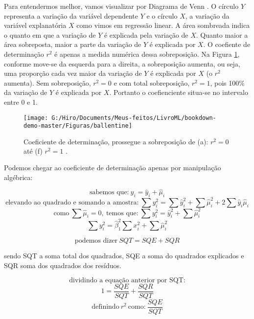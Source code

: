 \documentclass[
  openany]{book}
\begin{document}
Para entendermos melhor, vamos visualizar por Diagrama de Venn \citep{kennedy1981ballentine}. O círculo \(Y\) representa a variação da variável dependente \(Y\) e o círculo \(X\), a variação da variável explanatória \(X\) como vimos em regressão linear. A área sombreada indica o quanto em que a variação de \(Y\) é explicada pela variação de \(X\). Quanto maior a área sobreposta, maior a parte da variação de \(Y\) é explicada por \(X\). O coefiente de determinação \(r^2\) é apenas a medida numérica dessa sobreposição. Na Figura \ref{fig:ballentine}, conforme move-se da esquerda para a direita, a sobreposição aumenta, ou seja, uma proporção cada vez maior da variação de \(Y\)
é explicada por \(X\) (o \(r^2\) aumenta). Sem sobreposição, \(r^2=0\) e com total sobreposição, \(r^2=1\), pois 100\% da variação de \(Y\) é explicada por \(X\). Portanto o coefienciente situa-se no intervalo entre 0 e 1.

\begin{figure}

{\centering \texttt{[image: G:/Hiro/Documents/Meus-feitos/LivroML/bookdown-demo-master/Figuras/ballentine]} 

}

\caption{Coeficiente de determinação, prossegue a sobreposição de (a): \(r^2=0\) até (f) \(r^2=1\) \citep{gujarati2011econometria}.}\label{fig:ballentine}
\end{figure}



Podemos chegar ao coeficiente de determinação apenas por manipulação algébrica:

\[\mbox{sabemos que:} \ y_i=\hat{y}_i+\hat{\mu}_i\]
\[\mbox{elevando ao quadrado e somando a amostra:} \ \sum y^2_i=\sum \hat{y}^2_i+\sum \hat{\mu}^2_i+2\sum \hat{y}_i \hat{\mu}_i \]
\[\mbox{como} \ \sum \hat{\mu}_i=0, \ \mbox{temos que:}\ \sum y^2_i= \hat{y}^2_i+\sum \hat{\mu}^2_i \]
\[\sum y^2_i=\hat{\beta}^2_1 \sum x_i^2+\sum \hat{\mu}^2_i \]

\begin{equation}
    \mbox{podemos dizer} \ SQT=SQE+SQR
    \label{eq:sqt}
\end{equation}

sendo SQT a soma total dos quadrados, SQE a soma do quadrados explicados e SQR soma dos quadrados dos resíduos.

\[\mbox{dividindo a equação anterior por SQT:}\]
\[1=\frac{SQE}{SQT}+\frac{SQR}{SQT} \]
\[\mbox{definindo}\ r^2 \ \mbox{como:} \ \frac{SQE}{SQT} \]
\end{document}
